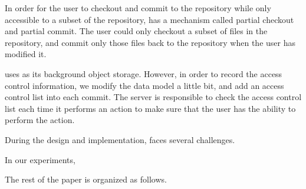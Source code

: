 In order for the user to checkout and commit to the repository while only
accessible to a subset of the repository, \sys has a mechanism called partial
checkout and partial commit. The user could only checkout a subset of files in
the repository, and commit only those files back to the repository when the user
has modified it.

\sys uses \git as its background object storage. However, in order to record the
access control information, we modify the data model a little bit, and add an
access control list into each commit. The server is responsible to check the
access control list each time it performs an action to make sure that the user
has the ability to perform the action.

During the design and implementation, \sys faces several challenges. 

In our experiments, 


The rest of the paper is organized as follows. 

